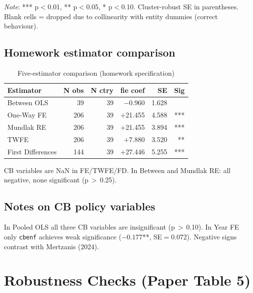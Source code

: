 \documentclass[12pt,a4paper]{article}
\begin{document}
\noindent\textit{Note}: *** p$<$0.01, ** p$<$0.05, * p$<$0.10.
Cluster-robust SE in parentheses.
Blank cells = dropped due to collinearity with entity dummies (correct behaviour).

\subsection{Homework estimator comparison}

\begin{table}[H]
\centering
\caption{Five-estimator comparison (homework specification)}
\label{tab:hw}
\begin{tabular}{lrrrrr}
\toprule
Estimator & N obs & N ctry & fie coef & SE & Sig \\
\midrule
Between OLS       & 39  & 39 & $-$0.960 & 1.628 & \\
One-Way FE        & 206 & 39 & $+$21.455 & 4.588 & *** \\
Mundlak RE        & 206 & 39 & $+$21.455 & 3.894 & *** \\
TWFE              & 206 & 39 & $+$7.880  & 3.520 & ** \\
First Differences & 144 & 39 & $+$27.446 & 5.255 & *** \\
\bottomrule
\end{tabular}
\end{table}

\noindent CB variables are NaN in FE/TWFE/FD. In Between and Mundlak RE:
all negative, none significant (p\,$>$\,0.25).

\subsection{Notes on CB policy variables}

In Pooled OLS all three CB variables are insignificant (p\,$>$\,0.10).
In Year FE only \texttt{cbenf} achieves weak significance
($-0.177$**, SE$=$0.072). Negative signs contrast with Mertzanis (2024).

\section{Robustness Checks (Paper Table 5)}
\end{document}
